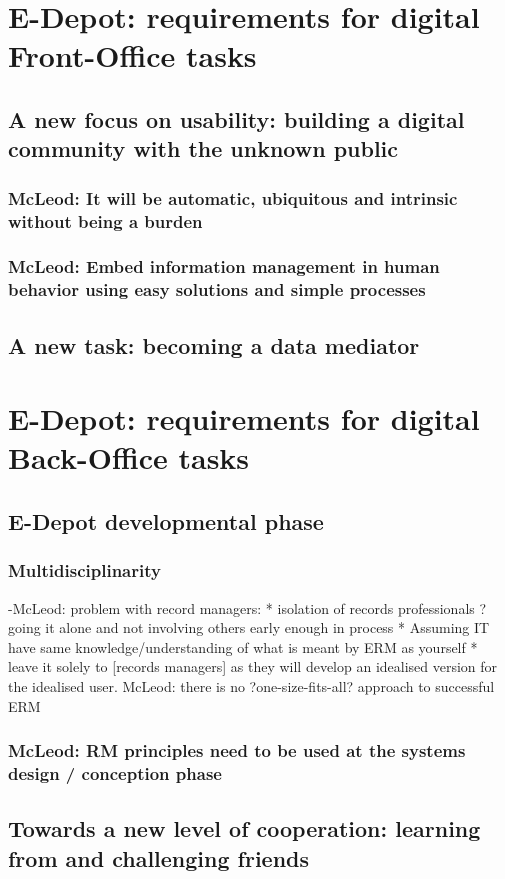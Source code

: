 \documentclass[twoside,11pt]{Latex/Classes/PhDthesisPSnPDF}
\begin{document}
\section{E-Depot: requirements for digital Front-Office tasks}
\subsection{A new focus on usability: building a digital community with the unknown public}
\subsubsection{McLeod: It will be automatic, ubiquitous and intrinsic without being a burden}
\subsubsection{McLeod: Embed information management in human behavior using easy solutions and
simple processes}
\subsection{A new task: becoming a data mediator}
\section{E-Depot: requirements for digital Back-Office tasks}
\subsection{E-Depot developmental phase}
\subsubsection{Multidisciplinarity}
-McLeod: problem with record managers:
* isolation of records professionals ? going it alone and not involving others early enough in process
* Assuming IT have same knowledge/understanding of what is meant by ERM as yourself
* leave it solely to [records managers] as they will develop an idealised version for the idealised user.
McLeod: there is no ?one-size-fits-all? approach to successful ERM
\subsubsection{McLeod: RM principles need to be used at the systems design / conception phase}
\subsection{Towards a new level of cooperation: learning from and challenging friends}
\end{document}
